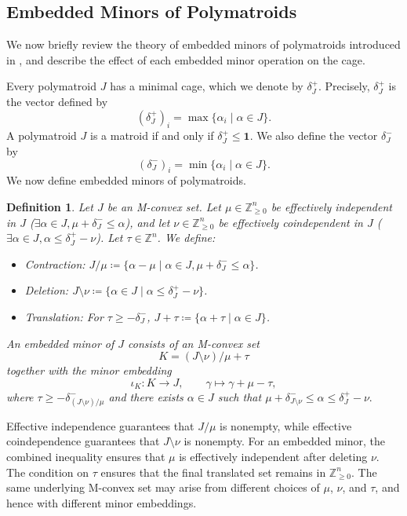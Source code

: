 \documentclass[10pt,a4paper]{amsart}
\newtheorem{definition}[theorem]{Definition}
\newcommand{\Zgeqn}{\mathbb{Z}_{\geq 0}^n}     %
\newcommand{\delplus}{\delta_J^+}
\newcommand{\delminus}{\delta_J^-}
\newcommand{\ones}{\textbf{1}}
\begin{document}
\subsection{Embedded Minors of Polymatroids}
We now briefly review the theory of embedded minors of polymatroids introduced in \cite{baker2025representationtheorypolymatroids}, and describe the effect of each embedded minor operation on the cage.

Every polymatroid $J$ has a minimal cage, which we denote by $\delplus$. Precisely, $\delplus$ is the vector defined by \[
(\delplus)_i = \max \{\alpha_i \mid \alpha \in J \}.
\]
A polymatroid $J$ is a matroid if and only if $\delplus \leq \ones$. We also define the vector $\delminus$ by \[
(\delminus)_i = \min \{\alpha_i \mid \alpha \in J \}.
\]
We now define embedded minors of polymatroids.

\begin{definition} \label{def:embedded_minor}
Let $J$ be an M-convex set. Let $\mu\in\Zgeqn$ be \emph{effectively independent} in $J$ ($\exists \alpha \in J, \mu +\delminus \leq \alpha$), and let $\nu\in\Zgeqn$ be \emph{effectively coindependent} in $J$ ($\exists \alpha \in J, \alpha \leq \delplus-\nu$). Let $\tau \in \mathbb{Z}^n$. We define:
\begin{itemize}
\item \emph{Contraction:} $J/\mu \coloneqq \{ \alpha - \mu \mid \alpha \in J, \mu + \delminus \leq \alpha\}$.
\item \emph{Deletion:} $J\setminus \nu \coloneqq \{\alpha \in J \mid \alpha \leq \delplus - \nu \}$.
\item \emph{Translation:} For $\tau \geq -\delminus$, $J + \tau \coloneqq \{ \alpha + \tau \mid \alpha \in J \}$.
\end{itemize}

An \emph{embedded minor} of $J$ consists of an M-convex set
\[
    K=(J\setminus\nu)/\mu+\tau
\]
together with the minor embedding
\[
    \iota_K\colon K\longrightarrow J,
    \qquad
    \gamma\longmapsto\gamma+\mu-\tau,
\]
where $\tau\geq-\delta^-_{(J\setminus\nu)/\mu}$ and there exists $\alpha\in J$ such that $\mu+\delta^-_{J\setminus\nu} \leq\alpha\leq\delta_J^+-\nu.$
\end{definition}

Effective independence guarantees that $J/\mu$ is nonempty, while
effective coindependence guarantees that $J\setminus\nu$ is nonempty.
For an embedded minor, the combined inequality ensures that $\mu$ is
effectively independent after deleting $\nu$. The condition on $\tau$
ensures that the final translated set remains in
$\mathbb{Z}_{\geq 0}^n$. The same underlying M-convex set may arise
from different choices of $\mu$, $\nu$, and $\tau$, and hence with
different minor embeddings.
\end{document}
